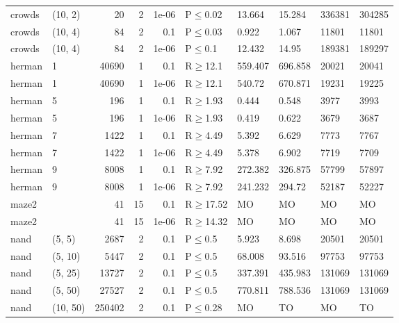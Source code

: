 \begin{longtable}{llrrrlllll}
 crowds        & (10, 2)   &     	20 &   2 & 1e-06 & P$\leq$0.02  & 13.664  & 15.284  & 336381  & 304285  \\
 crowds        & (10, 4)   &     	84 &   2 & 0.1   & P$\leq$0.03  & 0.922   & 1.067   & 11801   & 11801   \\
 crowds        & (10, 4)   &     	84 &   2 & 1e-06 & P$\leq$0.1   & 12.432  & 14.95   & 189381  & 189297  \\
 herman        & 1         &  	40690 &   1 & 0.1   & R$\geq$12.1  & 559.407 & 696.858 & 20021   & 20041   \\
 herman        & 1         &  	40690 &   1 & 1e-06 & R$\geq$12.1  & 540.72  & 670.871 & 19231   & 19225   \\
 herman        & 5         &    	196 &   1 & 0.1   & R$\geq$1.93  & 0.444   & 0.548   & 3977    & 3993    \\
 herman        & 5         &    	196 &   1 & 1e-06 & R$\geq$1.93  & 0.419   & 0.622   & 3679    & 3687    \\
 herman        & 7         &   	1422 &   1 & 0.1   & R$\geq$4.49  & 5.392   & 6.629   & 7773    & 7767    \\
 herman        & 7         &   	1422 &   1 & 1e-06 & R$\geq$4.49  & 5.378   & 6.902   & 7719    & 7709    \\
 herman        & 9         &   	8008 &   1 & 0.1   & R$\geq$7.92  & 272.382 & 326.875 & 57799   & 57897   \\
 herman        & 9         &   	8008 &   1 & 1e-06 & R$\geq$7.92  & 241.232 & 294.72  & 52187   & 52227   \\
 maze2         &           &     	41 &  15 & 0.1   & R$\geq$17.52 & MO      & MO      & MO      & MO      \\
 maze2         &           &     	41 &  15 & 1e-06 & R$\geq$14.32 & MO      & MO      & MO      & MO      \\
 nand          & (5, 5)    &   	2687 &   2 & 0.1   & P$\leq$0.5   & 5.923   & 8.698   & 20501   & 20501   \\
 nand          & (5, 10)   &   	5447 &   2 & 0.1   & P$\leq$0.5   & 68.008  & 93.516  & 97753   & 97753   \\
 nand          & (5, 25)   &  	13727 &   2 & 0.1   & P$\leq$0.5   & 337.391 & 435.983 & 131069  & 131069  \\
 nand          & (5, 50)   &  	27527 &   2 & 0.1   & P$\leq$0.5   & 770.811 & 788.536 & 131069  & 131069  \\
 nand          & (10, 50)  & 	250402 &   2 & 0.1   & P$\leq$0.28  & MO      & TO      & MO      & TO      \\

\end{longtable}
